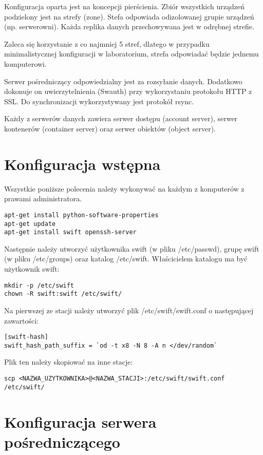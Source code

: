 \documentclass[12pt]{article}
\begin{document}
Konfiguracja oparta jest na koncepcji pierścienia. Zbiór wszystkich urządzeń podzielony jest na strefy (zone). Stefa odpowiada odizolowanej grupie urządzeń (np. serwerowni). Każda replika danych przechowywana jest w odrębnej strefie. 

Zaleca się korzystanie z co najmniej 5 stref, dlatego w przypadku minimalistycznej konfiguracji w laboratorium, strefa odpowiadać będzie jednemu komputerowi. 

Serwer pośredniczący odpowiedzialny jest za rozsyłanie danych. Dodatkowo dokonuje on uwierzytelnienia (Swauth) przy wykorzystaniu protokołu HTTP z SSL. 
Do synchronizacji wykorzystywany jest protokół rsync.

Każdy z serwerów danych zawiera serwer dostępu (account server), serwer kontenerów (container server) oraz serwer obiektów (object server).

\section{Konfiguracja wstępna}
Wszystkie poniższe polecenia należy wykonywać na każdym z komputerów z prawami administratora.

\begin{verbatim}
apt-get install python-software-properties
apt-get update
apt-get install swift openssh-server 
\end{verbatim}

Następnie należy utworzyć użytkownika swift (w pliku /etc/passwd), grupę swift (w pliku /etc/groups) oraz katalog /etc/swift. Właścicielem katalogu ma być użytkownik swift:

\begin{verbatim}
mkdir -p /etc/swift
chown -R swift:swift /etc/swift/
\end{verbatim}

Na pierwszej ze stacji należy utworzyć plik /etc/swift/swift.conf o następującej zawartości:

\begin{verbatim}
[swift-hash]
swift_hash_path_suffix = `od -t x8 -N 8 -A n </dev/random`
\end{verbatim}

Plik ten należy skopiować na inne stacje:

\begin{verbatim}
scp <NAZWA_UZYTKOWNIKA>@<NAZWA_STACJI>:/etc/swift/swift.conf /etc/swift/
\end{verbatim}

\section{Konfiguracja serwera pośredniczącego}
\end{document}
